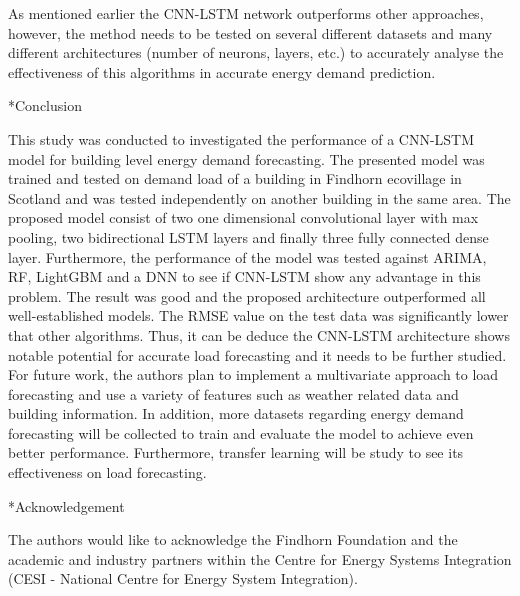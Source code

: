 \documentclass[twocolumn, a4paper,10pt]{article}
\makeatletter
\renewcommand\section{\@startsection{section}{1}{\z@}{0.25cm}{0.1cm}{\normalfont\large\bfseries}}
\makeatother
\begin{document}
As mentioned earlier the CNN-LSTM network outperforms other approaches, however, the method needs to be tested on several different datasets and many different architectures (number of neurons, layers, etc.) to accurately analyse the effectiveness of this algorithms in accurate energy demand prediction.

\section*{Conclusion}

This study was conducted to investigated the performance of a CNN-LSTM model for building level energy demand forecasting. The presented model was trained and tested on demand load of a building in Findhorn ecovillage in Scotland and was tested independently on another building in the same area. The proposed model consist of two one dimensional convolutional layer with max pooling, two bidirectional LSTM layers and finally three fully connected dense layer. Furthermore, the performance of the model was tested against ARIMA, RF, LightGBM and a DNN to see if CNN-LSTM show any advantage in this problem. The result was good and the proposed architecture outperformed all well-established models. The RMSE value on the test data was significantly lower that other algorithms. Thus, it can be deduce the CNN-LSTM architecture shows notable potential for accurate load forecasting and it needs to be further studied. For future work, the authors plan to implement a multivariate approach to load forecasting and use a variety of features such as weather related data and building information. In addition, more datasets regarding energy demand forecasting will be collected to train and evaluate the model to achieve even better performance. Furthermore, transfer learning will be study to see its effectiveness on load forecasting.

\section*{Acknowledgement}

The authors would like to acknowledge the Findhorn Foundation and the academic and industry partners within the Centre for Energy Systems Integration (CESI - National Centre for Energy System Integration).




\end{document}
